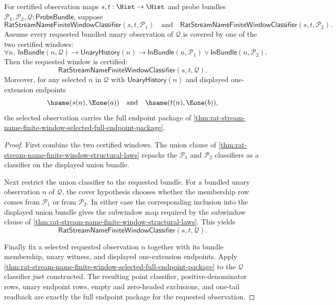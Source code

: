 \begin{theorem}
\label{thm:streamname-finite-window-cover-refinement-classifier}
For certified observation maps $s,t:\Hist\to\Hist$ and probe bundles
$\mathcal{P}_1,\mathcal{P}_2,\mathcal{Q}:\mathsf{ProbeBundle}$, suppose
$$
\mathsf{RatStreamNameFiniteWindowClassifier}(s,t,\mathcal{P}_1)
\quad\text{and}\quad
\mathsf{RatStreamNameFiniteWindowClassifier}(s,t,\mathcal{P}_2).
$$
Assume every requested bundled unary observation of $\mathcal{Q}$ is covered
by one of the two certified windows:
$$
\forall n,\ \mathsf{InBundle}(n,\mathcal{Q})\to
\mathsf{UnaryHistory}(n)\to
\mathsf{InBundle}(n,\mathcal{P}_1)\lor
\mathsf{InBundle}(n,\mathcal{P}_2).
$$
Then the requested window is certified:
$$
\mathsf{RatStreamNameFiniteWindowClassifier}(s,t,\mathcal{Q}).
$$
Moreover, for any selected $n$ in $\mathcal{Q}$ with
$\mathsf{UnaryHistory}(n)$ and displayed one-extension endpoints
$$
\hsame(s(n),\Eone(a))\quad\text{and}\quad \hsame(t(n),\Eone(b)),
$$
the selected observation carries the full endpoint package of
\autoref{thm:rat-stream-name-finite-window-selected-full-endpoint-package}.
\end{theorem}
\begin{proof}
First combine the two certified windows. The union clause of
\autoref{thm:rat-stream-name-finite-window-structural-laws} repacks the
$\mathcal{P}_1$ and $\mathcal{P}_2$ classifiers as a classifier on the
displayed union bundle.

Next restrict the union classifier to the requested bundle. For a bundled
unary observation $n$ of $\mathcal{Q}$, the cover hypothesis chooses whether
the membership row comes from $\mathcal{P}_1$ or from $\mathcal{P}_2$. In
either case the corresponding inclusion into the displayed union bundle gives
the subwindow map required by the subwindow clause of
\autoref{thm:rat-stream-name-finite-window-structural-laws}. This yields
$$
\mathsf{RatStreamNameFiniteWindowClassifier}(s,t,\mathcal{Q}).
$$

Finally fix a selected requested observation $n$ together with its bundle
membership, unary witness, and displayed one-extension endpoints. Apply
\autoref{thm:rat-stream-name-finite-window-selected-full-endpoint-package} to
the $\mathcal{Q}$ classifier just constructed. The resulting point classifier,
positive-denominator rows, unary endpoint rows, empty and zero-headed
exclusions, and one-tail readback are exactly the full endpoint package for
the requested observation.
\end{proof}

